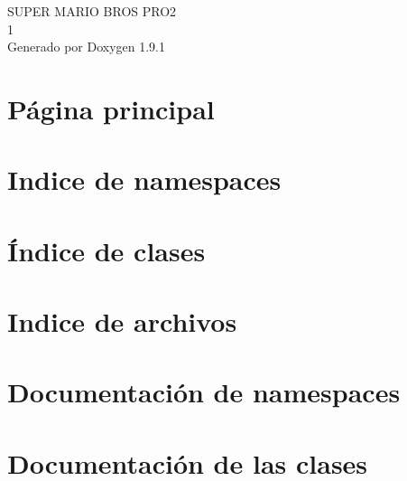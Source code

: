 \let\mypdfximage\pdfximage\def\pdfximage{\immediate\mypdfximage}\documentclass[twoside]{book}
\newcommand{\+}{\discretionary{\mbox{\scriptsize$\hookleftarrow$}}{}{}}
\newcommand{\clearemptydoublepage}{%
  \newpage{\pagestyle{empty}\cleardoublepage}%
}
\begin{document}
\raggedbottom

\hypersetup{pageanchor=false,
             bookmarksnumbered=true,
             pdfencoding=unicode
            }
\begin{titlepage}
\vspace*{7cm}
\begin{center}%
{\Large SUPER MARIO BROS PRO2 \\[1ex]\large 1 }\\
\vspace*{1cm}
{\large Generado por Doxygen 1.9.1}\\
\end{center}
\end{titlepage}
\clearemptydoublepage
{}
\tableofcontents
\clearemptydoublepage
{}
\hypersetup{pageanchor=true}

\chapter{Página principal}
\label{index}\hypertarget{index}{}
\chapter{Indice de namespaces}

\chapter{Índice de clases}

\chapter{Indice de archivos}

\chapter{Documentación de namespaces}

\chapter{Documentación de las clases}
















\end{document}
